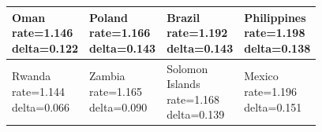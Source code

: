 \documentclass[runningheads]{llncs}
\begin{document}
{\begin{longtable}{p{}p{}p{}p{}}
\hline
\shortstack[l]{Oman\\ rate=1.146\\ delta=0.122} &\shortstack[l]{Poland\\ rate=1.166\\ delta=0.143} &\shortstack[l]{Brazil\\ rate=1.192\\ delta=0.143} &\shortstack[l]{Philippines\\ rate=1.198\\ delta=0.138} \\
\hline
\shortstack[l]{Rwanda\\ rate=1.144\\ delta=0.066} &\shortstack[l]{Zambia\\ rate=1.165\\ delta=0.090} &\shortstack[l]{Solomon\\ Islands\\ rate=1.168\\ delta=0.139} &\shortstack[l]{Mexico\\ rate=1.196\\ delta=0.151} \\
\hline
\end{longtable}

}
\end{document}
